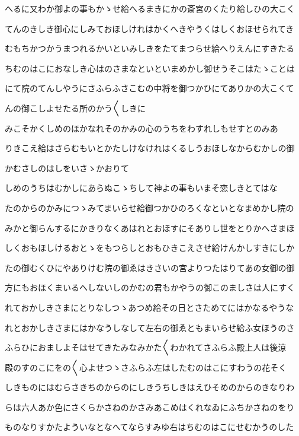 \documentclass[a4paper,11pt,landscape]{ltjtarticle}
\begin{document}
\par\medskip
へるに又わか御よの事もかゝせ給へるまきにかの斎宮のくたり給しひの大こく
\par\medskip
てんのきしき御心にしみておほしけれはかくへきやうくはしくおほせられてき
\par\medskip
むもちかつかうまつれるかいといみしきをたてまつらせ給へりえんにすきたる
\par\medskip
ちむのはこにおなしき心はのさまなといといまめかし御せうそこはたゝことは
\par\medskip
にて院のてんしやうにさふらふさこむの中将を御つかひにてありかの大こくて
\par\medskip
んの御こしよせたる所のかう〱しきに
\par\medskip
みこそかくしめのほかなれそのかみの心のうちをわすれしもせすとのみあ
\par\medskip
りきこえ給はさらむもいとかたしけなけれはくるしうおほしなからむかしの御
\par\medskip
かむさしのはしをいさゝかおりて
\par\medskip
しめのうちはむかしにあらぬこゝちして神よの事もいまそ恋しきとてはな
\par\medskip
たのからのかみにつゝみてまいらせ給御つかひのろくなといとなまめかし院の
\par\medskip
みかと御らんするにかきりなくあはれとおほすにそありし世をとりかへさまほ
\par\medskip
しくおもほしけるおとゝをもつらしとおもひきこえさせ給けんかしすきにしか
\par\medskip
たの御むくひにやありけむ院の御ゑはきさいの宮よりつたはりてあの女御の御
\par\medskip
方にもおほくまいるへしないしのかむの君もかやうの御このましさは人にすく
\par\medskip
れておかしきさまにとりなしつゝあつめ給その日とさためてにはかなるやうな
\par\medskip
れとおかしきさまにはかなうしなして左右の御ゑともまいらせ給ふ女ほうのさ
\par\medskip
ふらひにおましよそはせてきたみなみかた〱わかれてさふらふ殿上人は後涼
\par\medskip
殿のすのこにをの〱心よせつゝさふらふ左はしたむのはこにすわうの花そく
\par\medskip
しきものにはむらさきちのからのにしきうちしきはえひそめのからのきなりわ
\par\medskip
らは六人あか色にさくらかさねのかさみあこめはくれなゐにふちかさねのをり
\par\medskip
ものなりすかたよういなとなへてならすみゆ右はちむのはこにせむかうのした
\end{document}
